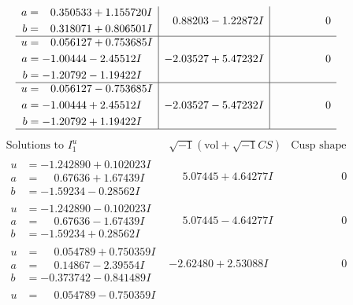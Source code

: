 \documentclass[1p]{elsarticle_modified}
\theoremstyle{definition}
\newcommand{\I}{\sqrt{-1}}
\begin{document}
$$\begin{array}{c|c|c}
\begin{aligned}
a &= \phantom{-}0.350533 + 1.155720 I \\
b &= \phantom{-}0.318071 + 0.806501 I\end{aligned}
 & \phantom{-}0.88203 - 1.22872 I & \phantom{-0.000000 } 0 \\ \hline\begin{aligned}
u &= \phantom{-}0.056127 + 0.753685 I \\
a &= -1.00444 - 2.45512 I \\
b &= -1.20792 - 1.19422 I\end{aligned}
 & -2.03527 + 5.47232 I & \phantom{-0.000000 } 0 \\ \hline\begin{aligned}
u &= \phantom{-}0.056127 - 0.753685 I \\
a &= -1.00444 + 2.45512 I \\
b &= -1.20792 + 1.19422 I\end{aligned}
 & -2.03527 - 5.47232 I & \phantom{-0.000000 } 0\\
 \hline 
 \end{array}$$\newpage$$\begin{array}{c|c|c}  
\text{Solutions to }I^u_{1}& \I (\text{vol} + \sqrt{-1}CS) & \text{Cusp shape}\\
 \hline 
\begin{aligned}
u &= -1.242890 + 0.102023 I \\
a &= \phantom{-}0.67636 + 1.67439 I \\
b &= -1.59234 - 0.28562 I\end{aligned}
 & \phantom{-}5.07445 + 4.64277 I & \phantom{-0.000000 } 0 \\ \hline\begin{aligned}
u &= -1.242890 - 0.102023 I \\
a &= \phantom{-}0.67636 - 1.67439 I \\
b &= -1.59234 + 0.28562 I\end{aligned}
 & \phantom{-}5.07445 - 4.64277 I & \phantom{-0.000000 } 0 \\ \hline\begin{aligned}
u &= \phantom{-}0.054789 + 0.750359 I \\
a &= \phantom{-}0.14867 - 2.39554 I \\
b &= -0.373742 - 0.841489 I\end{aligned}
 & -2.62480 + 2.53088 I & \phantom{-0.000000 } 0 \\ \hline\begin{aligned}
u &= \phantom{-}0.054789 - 0.750359 I \\

\end{aligned}
\end{array}$$
\end{document}
